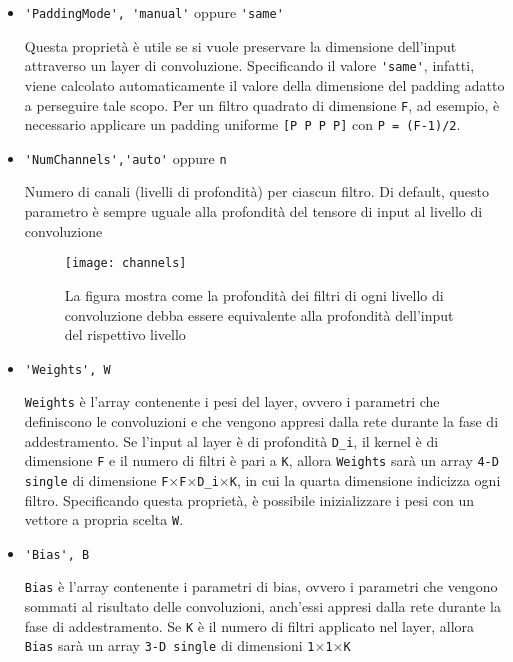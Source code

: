 \begin{itemize}
	\item \verb|'PaddingMode', 'manual'| oppure \verb|'same'|
	
	Questa proprietà è utile se si vuole preservare la dimensione dell'input attraverso un layer di convoluzione. Specificando il valore \verb|'same'|, infatti, viene calcolato automaticamente il valore della dimensione del padding adatto a perseguire tale scopo. Per un filtro quadrato di dimensione \verb|F|, ad esempio, è necessario applicare un padding uniforme \verb|[P P P P]| con \verb|P = (F-1)/2|.
	
	\item \verb|'NumChannels','auto'| oppure \verb|n|
	
	Numero di canali (livelli di profondità) per ciascun filtro. Di default, questo parametro è sempre uguale alla profondità del tensore di input al livello di convoluzione
	
	\begin{figure}[h]
		\centering
		\texttt{[image: channels]}
		\caption[Profondità dei filtri attraverso una CNN]{La figura mostra come la profondità dei filtri di ogni livello di convoluzione debba essere equivalente alla profondità dell'input del rispettivo livello}
		\label{fig:channels}
	\end{figure}

	\item \verb|'Weights', W|
	
	\verb|Weights| è l'array contenente i pesi del layer, ovvero i parametri che definiscono le convoluzioni e che vengono appresi dalla rete durante la fase di addestramento. Se l'input al layer è di profondità \verb|D_i|, il kernel è di dimensione \verb|F| e il numero di filtri è pari a \verb|K|, allora \verb|Weights| sarà un array \verb|4-D single| di dimensione \verb|F|$ \times $\verb|F|$ \times $\verb|D_i|$ \times $\verb|K|, in cui la quarta dimensione indicizza ogni filtro. Specificando questa proprietà, è possibile inizializzare i pesi con un vettore a propria scelta \verb|W|.
	
	\item \verb|'Bias', B|
	
	\verb|Bias| è l'array contenente i parametri di bias, ovvero i parametri che vengono sommati al risultato delle convoluzioni, anch'essi appresi dalla rete durante la fase di addestramento. Se \verb|K| è il numero di filtri applicato nel layer, allora \verb|Bias| sarà un array \verb|3-D single| di dimensioni \verb|1|$\times$\verb|1|$\times$\verb|K|
	

\end{itemize}
